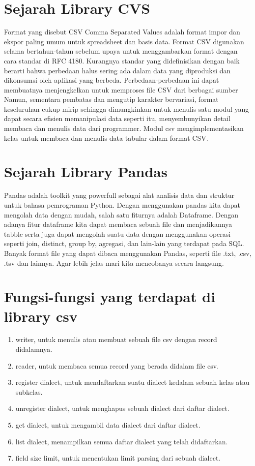 \documentclass[12pt, times new roman]{report}
\begin{document}
\section{Sejarah Library CVS}
\hspace{0.5cm}Format yang disebut CSV Comma Separated Values adalah format impor
dan ekspor paling umum untuk spreadsheet dan basis data. Format CSV digunakan selama bertahun-tahun sebelum upaya untuk menggambarkan format
dengan cara standar di RFC 4180. Kurangnya standar yang didefinisikan dengan baik berarti bahwa perbedaan halus sering ada dalam data yang diproduksi
dan dikonsumsi oleh aplikasi yang berbeda. Perbedaan-perbedaan ini dapat
membuatnya menjengkelkan untuk memproses file CSV dari berbagai sumber\\

Namun, sementara pembatas dan mengutip karakter bervariasi, format keseluruhan cukup mirip sehingga dimungkinkan untuk menulis satu modul yang
dapat secara efisien memanipulasi data seperti itu, menyembunyikan detail
membaca dan menulis data dari programmer. Modul csv mengimplementasikan
kelas untuk membaca dan menulis data tabular dalam format CSV.

\section{Sejarah Library Pandas}
\hspace{0.7cm}Pandas adalah toolkit yang powerfull sebagai alat analisis data dan struktur
untuk bahasa pemrograman Python. Dengan menggunakan pandas kita dapat
mengolah data dengan mudah, salah satu fiturnya adalah Dataframe. Dengan
adanya fitur dataframe kita dapat membaca sebuah file dan menjadikannya tabble serta juga dapat mengolah suatu data dengan menggunakan operasi seperti
join, distinct, group by, agregasi, dan lain-lain yang terdapat pada SQL. Banyak
format file yang dapat dibaca menggunakan Pandas, seperti file .txt, .csv, .tsv
dan lainnya. Agar lebih jelas mari kita mencobanya secara langsung.

\section{Fungsi-fungsi yang terdapat di library csv}
\begin{enumerate}
    \item  writer, untuk menulis atau membuat sebuah ﬁle csv dengan record didalamnya.
    \item reader, untuk membaca semua record yang berada didalam ﬁle csv.
    \item register dialect, untuk mendaftarkan suatu dialect kedalam sebuah kelas atau subkelas.
    \item unregister dialect, untuk menghapus sebuah dialect dari daftar dialect.
    \item get dialect, untuk mengambil data dialect dari daftar dialect.
    \item list dialect, menampilkan semua daftar dialect yang telah didaftarkan.
    \item ﬁeld size limit, untuk menentukan limit parsing dari sebuah dialect.
\end{enumerate}
\end{document}
